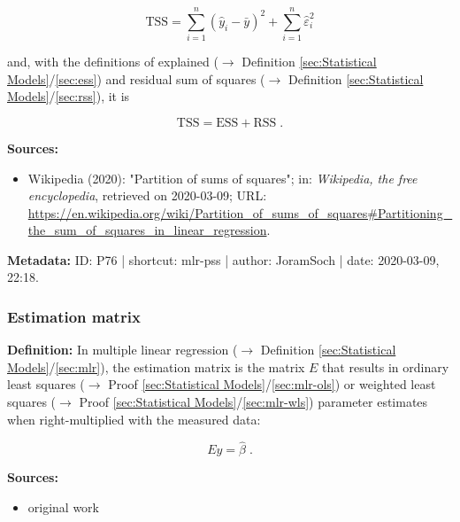 \documentclass[a4paper,12pt,twoside]{book}
\begin{document}
\begin{equation} \label{eq:mlr-pss-TSS-s2}
\mathrm{TSS} = \sum_{i=1}^{n} (\hat{y}_i - \bar{y})^2 + \sum_{i=1}^{n} \hat{\varepsilon}_i^2
\end{equation}

and, with the definitions of explained ($\rightarrow$ Definition \ref{sec:Statistical Models}/\ref{sec:ess}) and residual sum of squares ($\rightarrow$ Definition \ref{sec:Statistical Models}/\ref{sec:rss}), it is

\begin{equation} \label{eq:mlr-pss-TSS-s3}
\mathrm{TSS} = \mathrm{ESS} + \mathrm{RSS} \; .
\end{equation}


\vspace{1em}
\textbf{Sources:}
\begin{itemize}
\item Wikipedia (2020): "Partition of sums of squares"; in: \textit{Wikipedia, the free encyclopedia}, retrieved on 2020-03-09; URL: \url{https://en.wikipedia.org/wiki/Partition_of_sums_of_squares#Partitioning_the_sum_of_squares_in_linear_regression}.
\end{itemize}


\vspace{1em}
\textbf{Metadata:} ID: P76 | shortcut: mlr-pss | author: JoramSoch | date: 2020-03-09, 22:18.
\vspace{1em}



\subsubsection[\textit{Estimation matrix}]{Estimation matrix} \label{sec:emat}
\setcounter{equation}{0}

\textbf{Definition:} In multiple linear regression ($\rightarrow$ Definition \ref{sec:Statistical Models}/\ref{sec:mlr}), the estimation matrix is the matrix $E$ that results in ordinary least squares ($\rightarrow$ Proof \ref{sec:Statistical Models}/\ref{sec:mlr-ols}) or weighted least squares ($\rightarrow$ Proof \ref{sec:Statistical Models}/\ref{sec:mlr-wls}) parameter estimates when right-multiplied with the measured data:

\begin{equation} \label{eq:emat-em}
Ey = \hat{\beta} \; .
\end{equation}


\vspace{1em}
\textbf{Sources:}
\begin{itemize}
\item original work\end{itemize}
\end{document}
